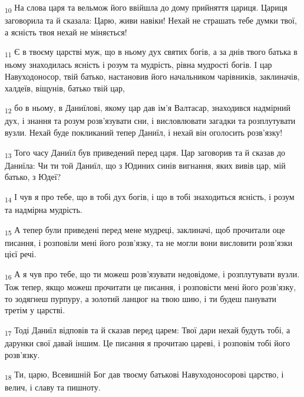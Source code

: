 \begin{tcolorbox}
\textsubscript{10} На слова царя та вельмож його ввійшла до дому прийняття цариця. Цариця заговорила та й сказала: Царю, живи навіки! Нехай не страшать тебе думки твої, а ясність твоя нехай не міняється!
\end{tcolorbox}
\begin{tcolorbox}
\textsubscript{11} Є в твоєму царстві муж, що в ньому дух святих богів, а за днів твого батька в ньому знаходилась ясність і розум та мудрість, рівна мудрості богів. І цар Навуходоносор, твій батько, настановив його начальником чарівників, заклиначів, халдеїв, віщунів, батько твій цар,
\end{tcolorbox}
\begin{tcolorbox}
\textsubscript{12} бо в ньому, в Даниїлові, якому цар дав ім'я Валтасар, знаходився надмірний дух, і знання та розум розв'язувати сни, і висловлювати загадки та розплутувати вузли. Нехай буде покликаний тепер Даниїл, і нехай він оголосить розв'язку!
\end{tcolorbox}
\begin{tcolorbox}
\textsubscript{13} Того часу Даниїл був приведений перед царя. Цар заговорив та й сказав до Даниїла: Чи ти той Даниїл, що з Юдиних синів вигнання, яких вивів цар, мій батько, з Юдеї?
\end{tcolorbox}
\begin{tcolorbox}
\textsubscript{14} І чув я про тебе, що в тобі дух богів, і що в тобі знаходиться ясність, і розум та надмірна мудрість.
\end{tcolorbox}
\begin{tcolorbox}
\textsubscript{15} А тепер були приведені перед мене мудреці, заклиначі, щоб прочитали оце писання, і розповіли мені його розв'язку, та не могли вони висловити розв'язки цієї речі.
\end{tcolorbox}
\begin{tcolorbox}
\textsubscript{16} А я чув про тебе, що ти можеш розв'язувати недовідоме, і розплутувати вузли. Тож тепер, якщо можеш прочитати це писання, і розповісти мені його розв'язку, то зодягнеш пурпуру, а золотий ланцюг на твою шию, і ти будеш панувати третім у царстві.
\end{tcolorbox}
\begin{tcolorbox}
\textsubscript{17} Тоді Даниїл відповів та й сказав перед царем: Твої дари нехай будуть тобі, а дарунки свої давай іншим. Це писання я прочитаю цареві, і розповім тобі його розв'язку.
\end{tcolorbox}
\begin{tcolorbox}
\textsubscript{18} Ти, царю, Всевишній Бог дав твоєму батькові Навуходоносорові царство, і велич, і славу та пишноту.
\end{tcolorbox}
